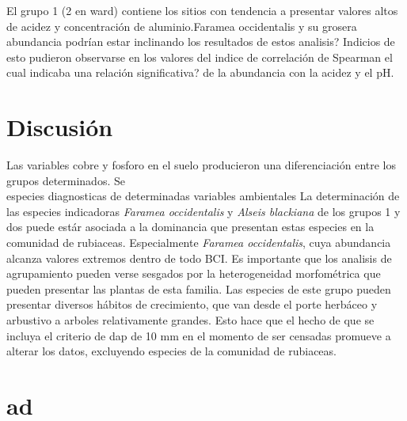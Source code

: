 \documentclass[11pt,]{article}
\begin{document}
El grupo 1 (2 en ward) contiene los sitios con tendencia a presentar
valores altos de acidez y concentración de aluminio.Faramea occidentalis
y su grosera abundancia podrían estar inclinando los resultados de estos
analisis? Indicios de esto pudieron observarse en los valores del indice
de correlación de Spearman el cual indicaba una relación significativa?
de la abundancia con la acidez y el pH.

\section{Discusión}\label{discusiuxf3n}

Las variables cobre y fosforo en el suelo producieron una diferenciación
entre los grupos determinados. Se\\
especies diagnosticas de determinadas variables ambientales La
determinación de las especies indicadoras \emph{Faramea occidentalis} y
\emph{Alseis blackiana} de los grupos 1 y dos puede estár asociada a la
dominancia que presentan estas especies en la comunidad de rubiaceas.
Especialmente \emph{Faramea occidentalis}, cuya abundancia alcanza
valores extremos dentro de todo BCI. Es importante que los analisis de
agrupamiento pueden verse sesgados por la heterogeneidad morfométrica
que pueden presentar las plantas de esta familia. Las especies de este
grupo pueden presentar diversos hábitos de crecimiento, que van desde el
porte herbáceo y arbustivo a arboles relativamente grandes. Esto hace
que el hecho de que se incluya el criterio de dap de 10 mm en el momento
de ser censadas promueve a alterar los datos, excluyendo especies de la
comunidad de rubiaceas.

\section{ad}\label{ad}
\end{document}
